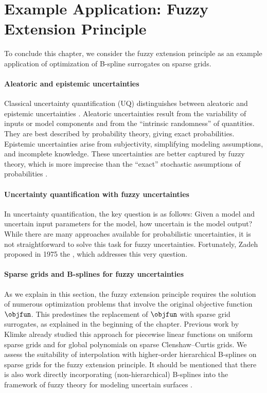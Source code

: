 \section{Example Application: Fuzzy Extension Principle}
\label{sec:55fuzzy}

To conclude this chapter, we consider the fuzzy extension principle
as an example application of optimization of B-spline surrogates
on sparse grids.

\paragraph{Aleatoric and epistemic uncertainties}

Classical uncertainty quantification (UQ) distinguishes between
aleatoric and epistemic uncertainties \cite{Walz16Fuzzy}.
Aleatoric uncertainties result from the variability of inputs or
model components and from the ``intrinsic randomness''
of quantities.
They are best described by probability theory, giving exact probabilities.
Epistemic uncertainties arise from subjectivity,
simplifying modeling assumptions, and incomplete knowledge.
These uncertainties are better captured by fuzzy theory,
which is more imprecise than the ``exact'' stochastic assumptions
of probabilities \cite{Walz16Fuzzy}.

\paragraph{Uncertainty quantification with fuzzy uncertainties}

In uncertainty quantification, the key question is as follows:
Given a model and uncertain input parameters for the model,
how uncertain is the model output?
While there are many approaches available
for probabilistic uncertainties,
it is not straightforward to solve this task
for fuzzy uncertainties.
Fortunately, Zadeh proposed in 1975
the  \cite{Zadeh75Concept},
which addresses this very question.

\paragraph{Sparse grids and B-splines for fuzzy uncertainties}

As we explain in this section,
the fuzzy extension principle requires the solution of numerous
optimization problems that involve the original objective function
$\objfun$.
This predestines the replacement of $\objfun$ with sparse grid surrogates,
as explained in the beginning of the chapter.
Previous work by Klimke \cite{Klimke06Uncertainty} already
studied this approach for piecewise linear functions on uniform sparse grids
and for global polynomials on sparse Clenshaw--Curtis grids.
We assess the suitability of interpolation with higher-order
hierarchical B-splines on sparse grids for the fuzzy extension principle.
It should be mentioned that there is also work
directly incorporating (non-hierarchical) B-splines
into the framework of fuzzy theory for modeling uncertain surfaces
.



